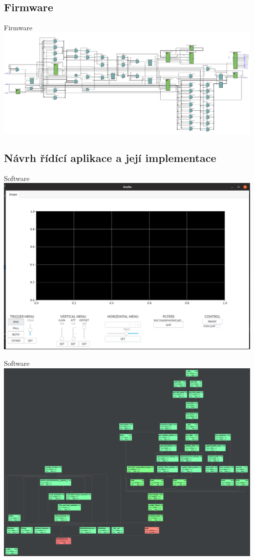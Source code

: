 \documentclass{beamer}
\begin{document}
	
	\subsection{Firmware}
		\begin{frame}{Firmware}
			\includegraphics[width=\paperwidth]{rtl_fake.png}
		\end{frame}
	\subsection{Návrh řídící aplikace a její implementace}
		\begin{frame}{Software}
			\includegraphics[width=\paperwidth]{oscilo_fake.png}
		\end{frame}
		\begin{frame}{Software}
			\includegraphics[width=\paperwidth]{profile_fake.png}
		\end{frame}
\end{document}
